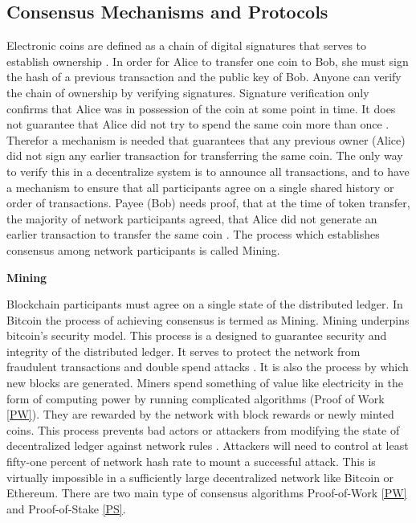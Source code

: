 \subsection{Consensus Mechanisms and Protocols} \label{Mining} 
Electronic coins are defined as a chain of digital signatures that serves to establish ownership \cite{paper:001}. In order for Alice to transfer one coin to Bob, she must sign the hash of a previous transaction and the public key of Bob. Anyone can verify the chain of ownership by verifying signatures. Signature verification only confirms that Alice was in possession of the coin at some point in time. It does not guarantee that Alice did not try to spend the same coin more than once \cite{paper:001}. Therefor a mechanism is needed that guarantees that any previous owner (Alice) did not sign any earlier transaction for transferring the same coin. The only way to verify this in a decentralize system is to announce all transactions, and to have a mechanism to ensure that all participants agree on a single shared history or order of transactions. Payee (Bob) needs proof, that at the time of token transfer, the majority of network participants agreed, that Alice did not generate an earlier transaction to transfer the same coin \cite{paper:001}. The process which establishes consensus among network participants is called Mining.

\textbf{Mining}

Blockchain participants must agree on a single state of the distributed ledger. In Bitcoin the process of achieving consensus is termed as Mining. Mining underpins bitcoin’s security model. This process is a designed to guarantee security and integrity of the distributed ledger. It serves to protect the network from fraudulent transactions and double spend attacks \cite{paper:001}. It is also the process by which new blocks are generated. Miners spend something of value like electricity in the form of computing power by running complicated algorithms (Proof of Work \ref{PW}). They are rewarded by the network with block rewards or newly minted coins. This process prevents bad actors or attackers from modifying the state of decentralized ledger against network rules \cite{paper:001}. Attackers will need to control at least fifty-one percent of network hash rate to mount a successful attack. This is virtually impossible in a sufficiently large decentralized network like Bitcoin or Ethereum. There are two main type of consensus algorithms Proof-of-Work \ref{PW} and Proof-of-Stake \ref{PS}.
\vspace{0.5cm}  
